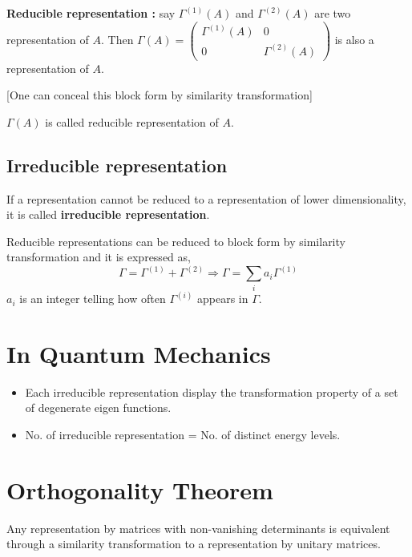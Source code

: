 \noindent
{\bf Reducible representation :} say $\Gamma^{(1)}(A)$ and $\Gamma^{(2)}(A)$ are two representation of $A$. Then $\Gamma(A)=\left(\begin{smallmatrix} \Gamma^{(1)}(A) & 0\\ 0 & \Gamma^{(2)}(A)\end{smallmatrix}\right)$ is also a representation of $A$.

[One can conceal this block form by similarity transformation]

$\Gamma(A)$ is called reducible representation of $A$.

\subsection*{Irreducible representation}

If a representation cannot be reduced to a representation of lower dimensionality, it is called {\bf irreducible representation}.

Reducible representations can be reduced to block form by similarity transformation and it is expressed as,
$$
\Gamma=\Gamma^{(1)}+\Gamma^{(2)}\Rightarrow \Gamma=\sum\limits_{i}a_{i}\Gamma^{(1)}
$$
$a_{i}$ is an integer telling how often $\Gamma^{(i)}$ appears in $\Gamma$.

\section*{In Quantum Mechanics}
\begin{itemize}
\item Each irreducible representation display the transformation property of a set of degenerate eigen functions.

\item No. of irreducible representation = No. of distinct energy levels.
\end{itemize}

\section*{Orthogonality Theorem}

\begin{lemma*}
Any representation by matrices with non-vanishing determinants is equivalent through a similarity transformation to a representation by unitary matrices.
\end{lemma*}

